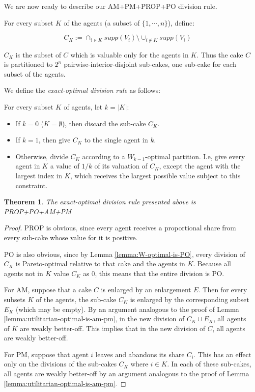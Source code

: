 \documentclass[a4paper,12pt]{article}
\newtheorem{thm}{Theorem}[section]
\begin{document}
We are now ready to describe our AM+PM+PROP+PO division rule.

For every subset $K$ of the agents (a subset of $\{1,\cdots,n\}$), define:

$$ C_K := \cap_{i\in K}{supp(V_i)} \setminus \cup_{i\notin K}{supp(V_i)} $$

$C_K$ is the subset of $C$ which is valuable only for the agents in $K$.
Thus the cake $C$ is partitioned to $2^n$ pairwise-interior-disjoint sub-cakes, one sub-cake for each subset of the agents.

We define the \emph{exact-optimal division rule} as follows:

For every subset $K$ of agents, let $k=|K|$:
\begin{itemize}
\item{If $k=0$ ($K=\emptyset$), then discard the sub-cake $C_K$.}
\item{If $k=1$, then give $C_K$ to the single agent in $k$.}
\item{Otherwise, divide $C_K$ according to a $W_{k-1}$-optimal partition. I.e, give every agent in $K$ a value of $1/k$ of its valuation of $C_K$, except the agent with the largest index in $K$, which receives the largest possible value subject to this constraint.}
\end{itemize}

\begin{thm}
The exact-optimal division rule presented above is PROP+PO+AM+PM
\end{thm}
\begin{proof}
PROP is obvious, since every agent receives a proportional share from every sub-cake whose value for it is positive.

PO is also obvious, since by Lemma \ref{lemma:W-optimal-is-PO}, every division of $C_K$ is Pareto-optimal relative to that cake and the agents in $K$. Because all agents not in $K$ value $C_K$ as 0, this means that the entire division is PO.

For AM, suppose that a cake $C$ is enlarged by an enlargement $E$. Then for every subsets $K$ of the agents, the sub-cake $C_K$ is enlarged by the corresponding subset $E_K$ (which may be empty). By an argument analogous to the proof of Lemma \ref{lemma:utilitarian-optimal-is-am-pm}, in the new division of $C_K\cup E_K$, all agents of $K$ are weakly better-off. This implies that in the new division of $C$, all agents are weakly better-off.

For PM, suppose that agent $i$ leaves and abandons its share $C_i$. This has an effect only on the divisions of the sub-cakes $C_K$ where $i\in K$. In each of these sub-cakes, all agents are weakly better-off by an argument analogous to the proof of Lemma \ref{lemma:utilitarian-optimal-is-am-pm}.
\end{proof}
\end{document}
